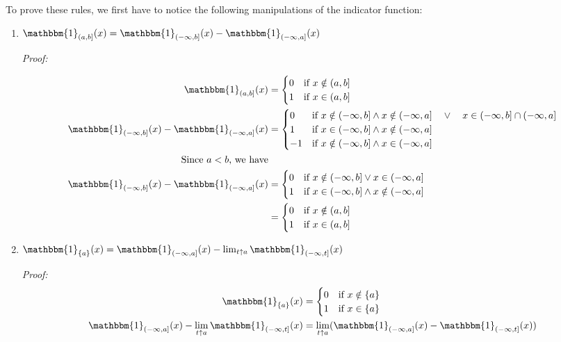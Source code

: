 \documentclass[12pt]{article}
\begin{document}
To prove these rules, we first have to notice the following manipulations of the indicator function:
\begin{enumerate}[label=\textbf{\alph*.   }]
    \item $ \mathbbm{1}_{(a,b]}(x) = \mathbbm{1}_{(-\infty,b]}(x)-\mathbbm{1}_{(-\infty,a]}(x) $

    \textit{Proof:} 
    
    \begin{align*}
    \mathbbm{1}_{(a,b]}(x) &= \begin{cases}
        0 & \text{if } x\notin (a,b]\\
        1 & \text{if } x\in (a,b]
    \end{cases}\\
    \mathbbm{1}_{(-\infty,b]}(x)-\mathbbm{1}_{(-\infty,a]}(x)&=\begin{cases}
        0 & \text{if } x\notin (-\infty,b] \land x\notin (-\infty,a] \quad \lor \quad x\in (-\infty,b] \cap (-\infty,a] \\       
        1 & \text{if } x\in (-\infty,b]\land x\notin (-\infty,a]\\
        -1 & \text{if } x\notin (-\infty,b]\land x\in (-\infty,a]
    \end{cases}\\
    \text{Since $a<b$, we have}\\
    \mathbbm{1}_{(-\infty,b]}(x)-\mathbbm{1}_{(-\infty,a]}(x)&=\begin{cases}
        0 & \text{if } x\notin (-\infty,b]  \lor x\in (-\infty,a] \\       
        1 & \text{if } x\in (-\infty,b]\land x\notin (-\infty,a]
    \end{cases}\\
    &=\begin{cases}
        0 & \text{if } x\notin (a,b]\\
        1 & \text{if } x\in (a,b]
    \end{cases}
\end{align*}


\item $ \mathbbm{1}_{\{a\}}(x)=\mathbbm{1}_{(-\infty,a]}(x)-\lim_{t \uparrow a}\mathbbm{1}_{(-\infty,t]}(x) $

\textit{Proof:}
\begin{align*}
    \mathbbm{1}_{\{a\}}(x)&=\begin{cases}
        0 & \text{if } x\notin \{a\}\\
        1 & \text{if } x\in \{a\}
    \end{cases}\\
                        \mathbbm{1}_{(-\infty,a]}(x)-\lim_{t \uparrow a}\mathbbm{1}_{(-\infty,t]}(x)&=
    \lim_{t \uparrow a}(\mathbbm{1}_{(-\infty,a]}(x)-                   \mathbbm{1}_{(-\infty,t]}(x))
\end{align*}


\end{enumerate}
\end{document}
